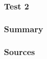 \documentclass[aspectratio=169]{beamer}
\title{}
\author{Tjark Sievers}
\date{}
\institute[I. ITP - Nonequilibrium Quantum Dynamics]{I. Institute of Theoretical Physics}
\begin{document}
{
\begin{frame}
	\titlepage
\end{frame}
}
\addtocounter{framenumber}{-1}

\begin{frame}
	\frametitle{Test 2}
\end{frame}

\begin{frame}
	\frametitle{Summary}

\end{frame}

\begin{frame}[allowframebreaks]
	\frametitle{Sources}

	\printbibliography

\end{frame}
\end{document}

